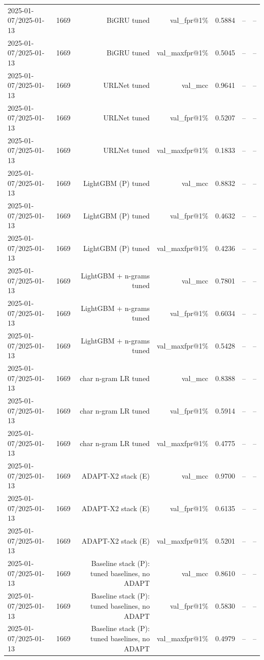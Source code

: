 \begin{table}[t]
\begin{tabular}{llrrrrr}
2025-01-07/2025-01-13 & 1669 & BiGRU tuned & val\_fpr@1\% & 0.5884 & -- & -- \\
2025-01-07/2025-01-13 & 1669 & BiGRU tuned & val\_maxfpr@1\% & 0.5045 & -- & -- \\
2025-01-07/2025-01-13 & 1669 & URLNet tuned & val\_mcc & 0.9641 & -- & -- \\
2025-01-07/2025-01-13 & 1669 & URLNet tuned & val\_fpr@1\% & 0.5207 & -- & -- \\
2025-01-07/2025-01-13 & 1669 & URLNet tuned & val\_maxfpr@1\% & 0.1833 & -- & -- \\
2025-01-07/2025-01-13 & 1669 & LightGBM (P) tuned & val\_mcc & 0.8832 & -- & -- \\
2025-01-07/2025-01-13 & 1669 & LightGBM (P) tuned & val\_fpr@1\% & 0.4632 & -- & -- \\
2025-01-07/2025-01-13 & 1669 & LightGBM (P) tuned & val\_maxfpr@1\% & 0.4236 & -- & -- \\
2025-01-07/2025-01-13 & 1669 & LightGBM + n-grams tuned & val\_mcc & 0.7801 & -- & -- \\
2025-01-07/2025-01-13 & 1669 & LightGBM + n-grams tuned & val\_fpr@1\% & 0.6034 & -- & -- \\
2025-01-07/2025-01-13 & 1669 & LightGBM + n-grams tuned & val\_maxfpr@1\% & 0.5428 & -- & -- \\
2025-01-07/2025-01-13 & 1669 & char n-gram LR tuned & val\_mcc & 0.8388 & -- & -- \\
2025-01-07/2025-01-13 & 1669 & char n-gram LR tuned & val\_fpr@1\% & 0.5914 & -- & -- \\
2025-01-07/2025-01-13 & 1669 & char n-gram LR tuned & val\_maxfpr@1\% & 0.4775 & -- & -- \\
2025-01-07/2025-01-13 & 1669 & ADAPT-X2 stack (E) & val\_mcc & 0.9700 & -- & -- \\
2025-01-07/2025-01-13 & 1669 & ADAPT-X2 stack (E) & val\_fpr@1\% & 0.6135 & -- & -- \\
2025-01-07/2025-01-13 & 1669 & ADAPT-X2 stack (E) & val\_maxfpr@1\% & 0.5201 & -- & -- \\
2025-01-07/2025-01-13 & 1669 & Baseline stack (P): tuned baselines, no ADAPT & val\_mcc & 0.8610 & -- & -- \\
2025-01-07/2025-01-13 & 1669 & Baseline stack (P): tuned baselines, no ADAPT & val\_fpr@1\% & 0.5830 & -- & -- \\
2025-01-07/2025-01-13 & 1669 & Baseline stack (P): tuned baselines, no ADAPT & val\_maxfpr@1\% & 0.4979 & -- & -- \\

\end{tabular}
\end{table}
